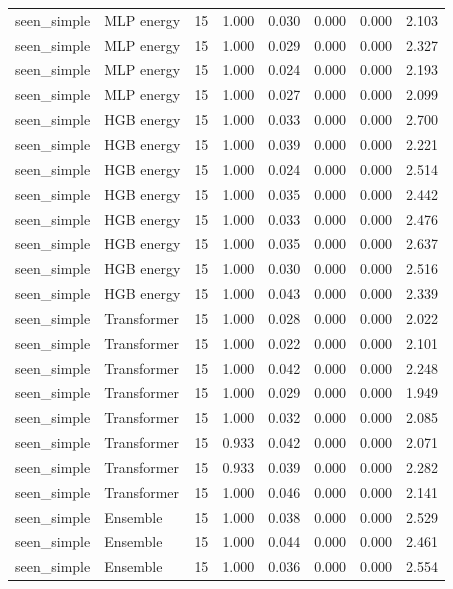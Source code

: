 {\begin{longtable}{llrrrrrr}
seen\_simple & MLP energy & 15 & 1.000 & 0.030 & 0.000 & 0.000 & 2.103 \\
seen\_simple & MLP energy & 15 & 1.000 & 0.029 & 0.000 & 0.000 & 2.327 \\
seen\_simple & MLP energy & 15 & 1.000 & 0.024 & 0.000 & 0.000 & 2.193 \\
seen\_simple & MLP energy & 15 & 1.000 & 0.027 & 0.000 & 0.000 & 2.099 \\
seen\_simple & HGB energy & 15 & 1.000 & 0.033 & 0.000 & 0.000 & 2.700 \\
seen\_simple & HGB energy & 15 & 1.000 & 0.039 & 0.000 & 0.000 & 2.221 \\
seen\_simple & HGB energy & 15 & 1.000 & 0.024 & 0.000 & 0.000 & 2.514 \\
seen\_simple & HGB energy & 15 & 1.000 & 0.035 & 0.000 & 0.000 & 2.442 \\
seen\_simple & HGB energy & 15 & 1.000 & 0.033 & 0.000 & 0.000 & 2.476 \\
seen\_simple & HGB energy & 15 & 1.000 & 0.035 & 0.000 & 0.000 & 2.637 \\
seen\_simple & HGB energy & 15 & 1.000 & 0.030 & 0.000 & 0.000 & 2.516 \\
seen\_simple & HGB energy & 15 & 1.000 & 0.043 & 0.000 & 0.000 & 2.339 \\
seen\_simple & Transformer & 15 & 1.000 & 0.028 & 0.000 & 0.000 & 2.022 \\
seen\_simple & Transformer & 15 & 1.000 & 0.022 & 0.000 & 0.000 & 2.101 \\
seen\_simple & Transformer & 15 & 1.000 & 0.042 & 0.000 & 0.000 & 2.248 \\
seen\_simple & Transformer & 15 & 1.000 & 0.029 & 0.000 & 0.000 & 1.949 \\
seen\_simple & Transformer & 15 & 1.000 & 0.032 & 0.000 & 0.000 & 2.085 \\
seen\_simple & Transformer & 15 & 0.933 & 0.042 & 0.000 & 0.000 & 2.071 \\
seen\_simple & Transformer & 15 & 0.933 & 0.039 & 0.000 & 0.000 & 2.282 \\
seen\_simple & Transformer & 15 & 1.000 & 0.046 & 0.000 & 0.000 & 2.141 \\
seen\_simple & Ensemble & 15 & 1.000 & 0.038 & 0.000 & 0.000 & 2.529 \\
seen\_simple & Ensemble & 15 & 1.000 & 0.044 & 0.000 & 0.000 & 2.461 \\
seen\_simple & Ensemble & 15 & 1.000 & 0.036 & 0.000 & 0.000 & 2.554 \\

\end{longtable}}
